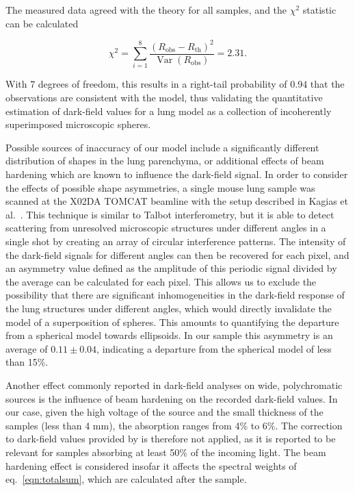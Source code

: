 The measured data agreed with the
theory for all samples, and the $\chi^2$ statistic can be calculated

\begin{equation}
    \chi^2 = \sum_{i=1}^8 \dfrac{(R_{\text{obs}} -
    R_{\text{th}})^2}{\mathop{\mathrm{Var}}(R_{\text{obs}})} = 2.31.
    \label{eqn:chisq}
\end{equation}

With 7 degrees of freedom, this results in a right-tail probability of 0.94 that the 
observations are consistent with the model, thus validating the quantitative estimation of
dark-field values for a lung model as a collection of incoherently
superimposed microscopic spheres.

Possible sources of inaccuracy of our model include a significantly
different distribution of shapes in the lung parenchyma, or additional
effects of beam hardening which are known to influence the dark-field
signal. In order to consider the effects of possible shape asymmetries, a
single mouse lung sample was scanned at the X02DA TOMCAT beamline with the
setup described in Kagias et al.~\cite{PhysRevLett.116.093902}. This
technique is similar to Talbot interferometry, but it is able to detect
scattering from unresolved microscopic structures under different angles in
a single shot by
creating an array of circular interference patterns. The intensity of the
dark-field signals for different angles can then be recovered for each
pixel, and an asymmetry value defined as the amplitude of this periodic
signal divided by the average can be calculated for each pixel. This allows
us to exclude the possibility that there are significant inhomogeneities in
the dark-field response of the lung structures under different angles, which
would directly invalidate the model of a superposition of spheres. This
amounts to quantifying the departure from a spherical model towards
ellipsoids. In our sample this asymmetry is an average of $0.11 \pm 0.04$, indicating a departure from the spherical model of less than 15\%.

Another effect commonly reported in dark-field analyses on wide, polychromatic
sources is the influence of beam hardening on the recorded dark-field
values. In our case, given the high voltage of the source and the small
thickness of the samples (less than 4 mm), the absorption ranges from 4\% to
6\%. The correction to dark-field values provided by is therefore
not applied, as it is reported to be relevant for samples absorbing at least
50\% of the incoming light. The beam hardening effect is considered insofar
it affects the spectral weights of eq.~\ref{eqn:totalsum}, which are calculated
after the sample. 
